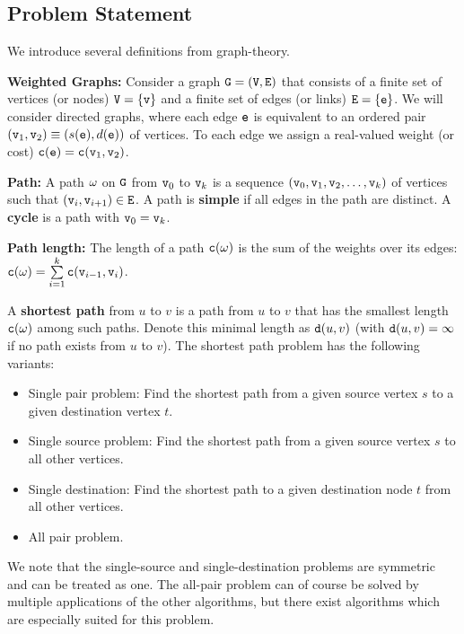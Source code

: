 \subsection{Problem Statement}
We introduce several definitions from graph-theory.
\begin{definition}\textbf{Weighted Graphs:} Consider a graph ${\tt G} = ({\tt V},{\tt E})$ that consists of a finite set of vertices (or nodes) ${\tt V} = \{ {\tt v}\} $ and a finite set of edges (or links) ${\tt E} = \{ {\tt e}\} $. We will consider directed graphs, where each edge ${\tt e}$ is equivalent to an ordered pair $({{\tt v}_1},{{\tt v}_2}) \equiv (s({\tt e}),d({\tt e}))$ of vertices. To each edge we assign a real-valued weight (or cost) ${\tt c}({\tt e}) = {\tt c}({{\tt v}_1},{{\tt v}_2})$.
\end{definition}
\begin{definition}\textbf{Path:}
A path ${\tt \omega}$ on ${\tt G}$ from ${{\tt v}_0}$ to ${{\tt v}_k}$ is a sequence $({{\tt v}_0},{{\tt v}_1},{{\tt v}_2}, \ldots ,{{\tt v}_k})$ of vertices such that $({{\tt v}_i},{{\tt v}_{i + 1}}) \in {\tt E}$. A path is \textbf{simple} if all edges in the path are distinct.
A \textbf{cycle}  is a path with ${{\tt v}_0} = {{\tt v}_k}$.
\end{definition}
\begin{definition}\textbf{Path length:}
The length of a path ${\tt c}({\tt \omega})$ is the sum of the weights over its edges:
${\tt c}({\tt \omega}) = \sum\limits_{i = 1}^k {{\tt c}({{\tt v}_{i - 1}},{{\tt v}_i})} $.
\end{definition}

A \textbf{shortest path} from $u$ to $v$ is a path from $u$ to $v$ that has the smallest length  ${\tt c}({\tt \omega})$ among such paths. Denote this minimal length as ${\tt d}(u,v)$ (with ${\tt d}(u,v) = \infty $ if no path exists from $u$ to $v$).
The shortest path problem has the following variants:
\begin{itemize}
  \item Single pair problem:  Find the shortest path from a given source vertex $s$ to a given destination vertex $t$.
  \item Single source problem: Find the shortest path from a given source vertex $s$ to all other vertices.
  \item Single destination: Find the shortest path to a given destination node $t$ from all other vertices.
  \item All pair problem.
\end{itemize}

We note that the single-source and single-destination problems are symmetric and can be treated as one.  The all-pair problem can of course be solved by multiple applications of the other algorithms, but there exist algorithms which are especially suited for this problem.


